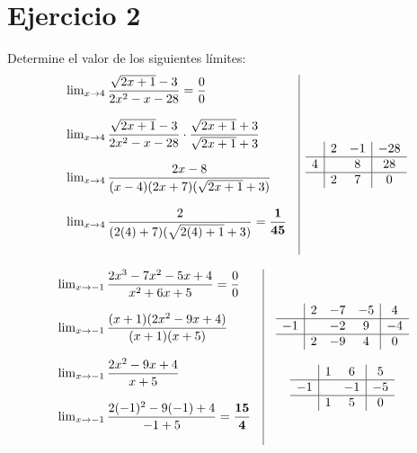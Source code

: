 \documentclass[12pt]{article}
\begin{document}
\newpage
\section*{Ejercicio 2}
\noindent Determine el valor de los siguientes límites:
\[
\begin{array}{l|c}
  \begin{array}{l}
    \lim_{x \to 4} \dfrac{\sqrt{2x+1} - 3}{2x^2-x-28} = \dfrac{0}{0} \\\\
    \lim_{x \to 4} \dfrac{\sqrt{2x+1}-3}{2x^2-x-28} \cdot \dfrac{\sqrt{2x+1}+3}{\sqrt{2x+1}+3} \\\\
    \lim_{x \to 4} \dfrac{2x-8}{(x-4)(2x+7)(\sqrt{2x+1}+3)} \\\\
    \lim_{x \to 4} \dfrac{2}{(2(4)+7)(\sqrt{2(4)+1}+3)} = \mathbf{\dfrac{1}{45}} \\\\
  \end{array}
  &
  \begin{array}{c|c c|c}
    & 2 & -1 & -28 \\
    \hline
    4 &  & 8  & 28 \\
    \hline
    & 2 & 7  & 0 \\
  \end{array}
\end{array}
\]

\[
\begin{array}{l|c}
  \begin{array}{l}
    \lim_{x \to -1} \dfrac{2x^3 - 7x^2 - 5x + 4}{x^2 + 6x + 5} = \dfrac{0}{0} \\\\
    \lim_{x \to -1} \dfrac{(x+1)(2x^2 - 9x + 4)}{(x+1)(x+5)} \\\\
    \lim_{x \to -1} \dfrac{2x^2 - 9x + 4}{x+5} \\\\
    \lim_{x \to -1} \dfrac{2(-1)^2 - 9(-1) + 4}{-1 + 5} = \mathbf{\dfrac{15}{4}} \\\\
  \end{array}
  &
  \begin{array}{c}
    \begin{array}{c|c c c|c}
      & 2 & -7 & -5 & 4 \\
      \hline
      -1 &  & -2 & 9 & -4 \\
      \hline
      & 2 & -9 & 4 & 0 \\
    \end{array} \\\\
    \begin{array}{c|c c|c}
      & 1 & 6 & 5 \\
      \hline
      -1 &  & -1 & -5 \\
      \hline
      & 1 & 5 & 0 \\
    \end{array}
  \end{array}
\end{array}
\]
\end{document}
